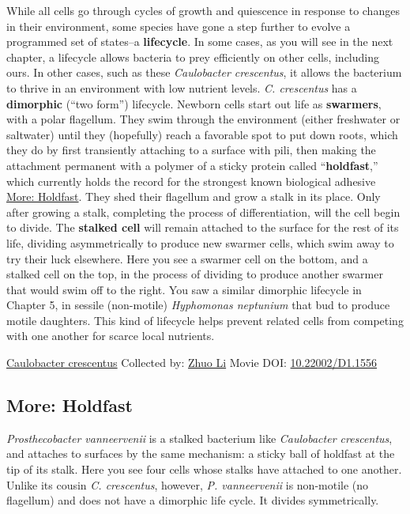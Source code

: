 \documentclass[]{tufte-book}
\begin{document}
While all cells go through cycles of growth and quiescence in response to changes in their environment, some species have gone a step further to evolve a programmed set of states--a \textbf{lifecycle}. In some cases, as you will see in the next chapter, a lifecycle allows bacteria to prey efficiently on other cells, including ours. In other cases, such as these \emph{Caulobacter crescentus}, it allows the bacterium to thrive in an environment with low nutrient levels. \emph{C. crescentus} has a \textbf{dimorphic} (``two form'') lifecycle. Newborn cells start out life as \textbf{swarmers}, with a polar flagellum. They swim through the environment (either freshwater or saltwater) until they (hopefully) reach a favorable spot to put down roots, which they do by first transiently attaching to a surface with pili, then making the attachment permanent with a polymer of a sticky protein called ``\textbf{holdfast},'' which currently holds the record for the strongest known biological adhesive \protect\hyperlink{Holdfast}{More: Holdfast}. They shed their flagellum and grow a stalk in its place. Only after growing a stalk, completing the process of differentiation, will the cell begin to divide. The \textbf{stalked cell} will remain attached to the surface for the rest of its life, dividing asymmetrically to produce new swarmer cells, which swim away to try their luck elsewhere. Here you see a swarmer cell on the bottom, and a stalked cell on the top, in the process of dividing to produce another swarmer that would swim off to the right. You saw a similar dimorphic lifecycle in Chapter 5, in sessile (non-motile) \emph{Hyphomonas neptunium} that bud to produce motile daughters. This kind of lifecycle helps prevent related cells from competing with one another for scarce local nutrients.



\hypertarget{htmlwidget-0f61b2b10a315e292015}{}

\label{fig:8-4}\protect\hyperlink{tree}{Caulobacter crescentus} Collected by: \protect\hyperlink{zhuo_li}{Zhuo Li} Movie DOI: \href{https://doi.org/10.22002/D1.1556}{10.22002/D1.1556}

\hypertarget{Holdfast}{%
\subsection*{More: Holdfast}\label{Holdfast}}

\emph{Prosthecobacter vanneervenii} is a stalked bacterium like \emph{Caulobacter crescentus}, and attaches to surfaces by the same mechanism: a sticky ball of holdfast at the tip of its stalk. Here you see four cells whose stalks have attached to one another. Unlike its cousin \emph{C. crescentus}, however, \emph{P. vanneervenii} is non-motile (no flagellum) and does not have a dimorphic life cycle. It divides symmetrically.
\end{document}
